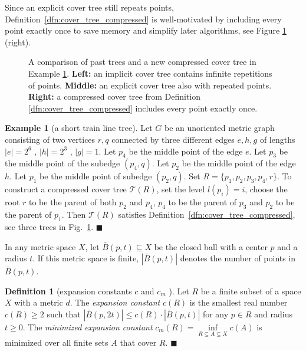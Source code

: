 \documentclass[a4paper,UKenglish,cleveref, autoref]{lipics-v2019}
\numberwithin{algocf}{section}
\theoremstyle{definition}
\newtheorem{dfn}[algocf]{Definition}
\theoremstyle{definition}
\newtheorem{exa}[algocf]{Example}
\theoremstyle{definition}
\theoremstyle{plain}
\newcommand{\T}{\mathcal{T}}
\newcommand{\bs}{\hfill $\blacksquare$}
\begin{document}
Since an explicit cover tree still repeats points, Definition~\ref{dfn:cover_tree_compressed} is well-motivated by including every point exactly once to save memory and simplify later algorithms, see Figure \ref{fig:tripleexample} (right).

\begin{figure}
    \centering
   
   \caption{A comparison of past trees and a new compressed cover tree in Example \ref{exa:implicitexplicitexample}. \textbf{Left:} an implicit cover tree contains infinite repetitions of points. \textbf{Middle:} an explicit cover tree also with repeated points. \textbf{Right:} a compressed cover tree from Definition \ref{dfn:cover_tree_compressed} includes every point exactly once.  }
    \label{fig:tripleexample}
\end{figure}

\begin{exa}[a short train line tree]
\label{exa:implicitexplicitexample}
Let $G$ be an unoriented metric graph consisting of two vertices $r,q$ connected by three different edges $e,h,g$ of lengths $|e| = 2^6$ , $|h| = 2^{3}$ , $|g| = 1$. 
Let $p_{4}$ be the middle point of the edge $e$. 
Let $p_{3}$ be the middle point of the subedge $(p_4 , q)$. 
Let $p_{2}$ be the middle point of the edge $h$.
Let $p_{1}$ be the middle point of subedge $(p_{2}, q)$. 
Set $R = \{p_1, p_2,p_3,p_4,r\}$. 
To construct a compressed cover tree $\T(R)$, set the level $l(p_i) = i$, choose the root $r$ to be the parent of both $p_2$ and $p_4$, $p_4$ to be the parent of $p_{3}$ and $p_{2}$ to be the parent of $p_{1}$. Then $\T(R)$ satisfies Definition~\ref{dfn:cover_tree_compressed}, see  three trees in Fig.~\ref{fig:tripleexample}.
\bs
\end{exa}

In any metric space $X$, let $\bar B(p,t)\subseteq X$ be the closed ball with a center $p$ and a radius $t$.
If this metric space is finite, $|\bar B(p,t)|$ denotes the number of points in $\bar B(p,t)$. 

\begin{dfn}[expansion constants $c$ \cite{beygelzimer2006cover} and $c_m$ {\cite[Definition~2.4]{elkin2021new}}]
\label{dfn:expansion_constant}
Let $R$ be a finite subset of a space $X$ with a metric $d$. 
The \emph{expansion constant} $c(R)$ is the smallest real number $c(R)\geq 2$ such that $|\bar{B}(p,2t)|\leq c(R) \cdot |\bar{B}(p,t)|$ for any $p\in R$ and radius $t\geq 0$.  
The \emph{minimized expansion constant} $c_m(R) = \inf\limits_{R\subseteq A\subseteq X}c(A)$ is minimized over all finite sets $A$ that cover $R$.  
\bs
\end{dfn}
\end{document}

